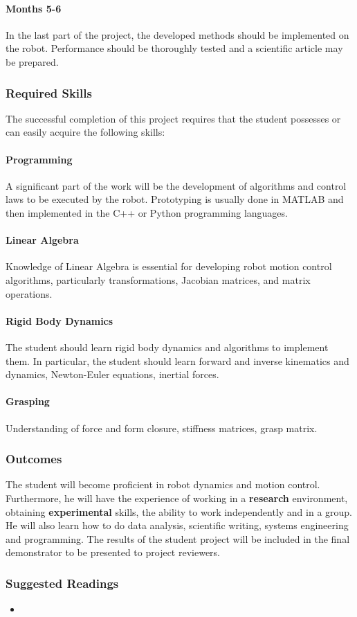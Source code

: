 \paragraph{Months 5-6}
In the last part of the project, the developed methods should be implemented on the robot. Performance should be thoroughly tested and a scientific article may be prepared.
\subsubsection{Required Skills}
The successful completion of this project requires that the student possesses or can easily acquire the following skills: 
\paragraph{Programming} A significant part of the work will be the development of algorithms and control laws to be executed by the robot. Prototyping is usually done in MATLAB and then implemented in the C++ or Python programming languages.
\paragraph{Linear Algebra} Knowledge of Linear Algebra is essential for developing robot motion control algorithms, particularly  transformations, Jacobian matrices, and matrix operations.
\paragraph{Rigid Body Dynamics} 
The student should learn rigid body dynamics and algorithms to implement them.
In particular, the student should learn forward and inverse kinematics and dynamics, Newton-Euler equations, inertial forces.
\paragraph{Grasping} 
Understanding of force and form closure, stiffness matrices, grasp matrix.

\subsubsection{Outcomes}
The student will become proficient in robot dynamics and motion control. 
Furthermore, he will have the experience of working in a \textbf{research} environment, obtaining \textbf{experimental} skills, the ability to work independently and in a group. He will also learn how to do data analysis, scientific writing, systems engineering and programming.
The results of the student project will be included in the final demonstrator to be presented to project reviewers.

\subsubsection{Suggested Readings}
\begin{itemize}
	\item
\end{itemize}
